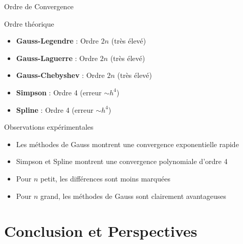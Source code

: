 \documentclass[aspectratio=169,11pt]{beamer}
\begin{document}
\begin{frame}{Ordre de Convergence}
\vspace{-0.2cm}
\begin{block}{Ordre théorique}
\small
\begin{itemize}
\item \textbf{Gauss-Legendre} : Ordre $2n$ (très élevé)
\item \textbf{Gauss-Laguerre} : Ordre $2n$ (très élevé)
\item \textbf{Gauss-Chebyshev} : Ordre $2n$ (très élevé)
\item \textbf{Simpson} : Ordre 4 (erreur $\sim h^4$)
\item \textbf{Spline} : Ordre 4 (erreur $\sim h^4$)
\end{itemize}
\end{block}

\vspace{-0.15cm}
\begin{block}{Observations expérimentales}
\small
\begin{itemize}
\item Les méthodes de Gauss montrent une convergence exponentielle rapide
\item Simpson et Spline montrent une convergence polynomiale d'ordre 4
\item Pour $n$ petit, les différences sont moins marquées
\item Pour $n$ grand, les méthodes de Gauss sont clairement avantageuses
\end{itemize}
\end{block}
\end{frame}

\section{Conclusion et Perspectives}
\end{document}
